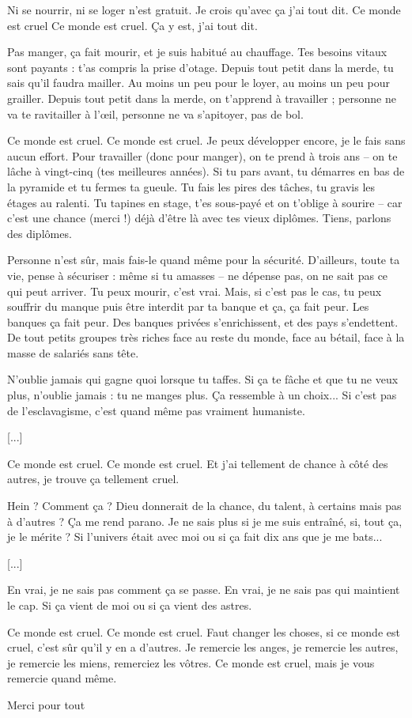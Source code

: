 {\color{white}
Ni se nourrir, ni se loger n'est gratuit.
Je crois qu'avec ça j'ai tout dit.
Ce monde est cruel
Ce monde est cruel.
Ça y est, j'ai tout dit.

Pas manger, ça fait mourir, et je suis habitué au chauffage.
Tes besoins vitaux sont payants : t'as compris la prise d'otage.
Depuis tout petit dans la merde, tu sais qu'il faudra mailler.
Au moins un peu pour le loyer, au moins un peu pour grailler.
Depuis tout petit dans la merde, on t'apprend à travailler ;
personne ne va te ravitailler à l'œil,
personne ne va s'apitoyer, pas de bol.

Ce monde est cruel.
Ce monde est cruel.
Je peux développer encore, je le fais sans aucun effort.
Pour travailler (donc pour manger), on te prend à trois ans
-- on te lâche à vingt-cinq (tes meilleures années).
Si tu pars avant, tu démarres en bas de la pyramide
et tu fermes ta gueule. Tu fais les pires des tâches,
tu gravis les étages au ralenti. Tu tapines en stage,
t'es sous-payé et on t'oblige à sourire --
car c'est une chance (merci !) déjà d'être là
avec tes vieux diplômes. Tiens, parlons des diplômes.

Personne n'est sûr, mais fais-le quand même pour la sécurité.
D'ailleurs, toute ta vie, pense à sécuriser :
même si tu amasses -- ne dépense pas,
on ne sait pas ce qui peut arriver.
Tu peux mourir, c'est vrai. Mais, si c'est pas le cas,
tu peux souffrir du manque puis être interdit par ta banque
et ça, ça fait peur. Les banques ça fait peur.
Des banques privées s'enrichissent, et des pays s'endettent.
De tout petits groupes très riches face au reste du monde,
face au bétail, face à la masse de salariés sans tête.

N'oublie jamais qui gagne quoi lorsque tu taffes.
Si ça te fâche et que tu ne veux plus,
n'oublie jamais : tu ne manges plus.
Ça ressemble à un choix...
Si c'est pas de l'esclavagisme,
c'est quand même pas vraiment humaniste.

[...]

Ce monde est cruel.
Ce monde est cruel.
Et j'ai tellement de chance à côté des autres,
je trouve ça tellement cruel.

Hein ? Comment ça ? Dieu donnerait de la chance, du talent,
à certains mais pas à d'autres ? Ça me rend parano.
Je ne sais plus si je me suis entraîné, si, tout ça, je le mérite ?
Si l'univers était avec moi ou si ça fait dix ans que je me bats...

[...]

En vrai, je ne sais pas comment ça se passe.
En vrai, je ne sais pas qui maintient le cap.
Si ça vient de moi ou si ça vient des astres.

Ce monde est cruel.
Ce monde est cruel.
Faut changer les choses, si ce monde est cruel,
c'est sûr qu'il y en a d'autres.
Je remercie les anges, je remercie les autres,
je remercie les miens, remerciez les vôtres.
Ce monde est cruel, mais je vous remercie quand même.

Merci pour tout
}
